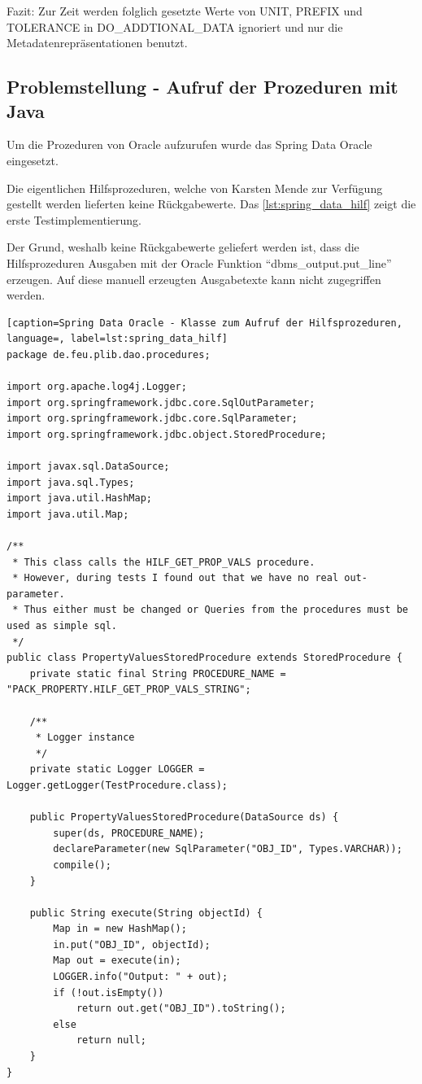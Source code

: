 Fazit:
Zur Zeit werden folglich gesetzte Werte von UNIT, PREFIX und TOLERANCE in DO\_ADDTIONAL\_DATA ignoriert und nur die Metadatenrepräsentationen benutzt.  

\subsection{Problemstellung - Aufruf der Prozeduren mit Java}
Um die Prozeduren von Oracle aufzurufen wurde das Spring Data Oracle eingesetzt. 

Die eigentlichen Hilfsprozeduren, welche von Karsten Mende zur Verfügung gestellt werden lieferten keine Rückgabewerte. Das \autoref{lst:spring_data_hilf} zeigt die erste Testimplementierung. 

Der Grund, weshalb keine Rückgabewerte geliefert werden ist, dass die Hilfsprozeduren Ausgaben mit der Oracle Funktion \enquote{dbms\_output.put\_line} erzeugen. Auf diese manuell erzeugten Ausgabetexte kann nicht zugegriffen werden. 

\begin{lstlisting}[caption=Spring Data Oracle - Klasse zum Aufruf der Hilfsprozeduren, language=, label=lst:spring_data_hilf]
package de.feu.plib.dao.procedures;

import org.apache.log4j.Logger;
import org.springframework.jdbc.core.SqlOutParameter;
import org.springframework.jdbc.core.SqlParameter;
import org.springframework.jdbc.object.StoredProcedure;

import javax.sql.DataSource;
import java.sql.Types;
import java.util.HashMap;
import java.util.Map;

/**
 * This class calls the HILF_GET_PROP_VALS procedure.
 * However, during tests I found out that we have no real out-parameter.
 * Thus either must be changed or Queries from the procedures must be used as simple sql.
 */
public class PropertyValuesStoredProcedure extends StoredProcedure {
    private static final String PROCEDURE_NAME = "PACK_PROPERTY.HILF_GET_PROP_VALS_STRING";

    /**
     * Logger instance
     */
    private static Logger LOGGER = Logger.getLogger(TestProcedure.class);

    public PropertyValuesStoredProcedure(DataSource ds) {
        super(ds, PROCEDURE_NAME);
        declareParameter(new SqlParameter("OBJ_ID", Types.VARCHAR));
        compile();
    }

    public String execute(String objectId) {
        Map in = new HashMap();
        in.put("OBJ_ID", objectId);
        Map out = execute(in);
        LOGGER.info("Output: " + out);
        if (!out.isEmpty())
            return out.get("OBJ_ID").toString();
        else
            return null;
    }
}

\end{lstlisting}

